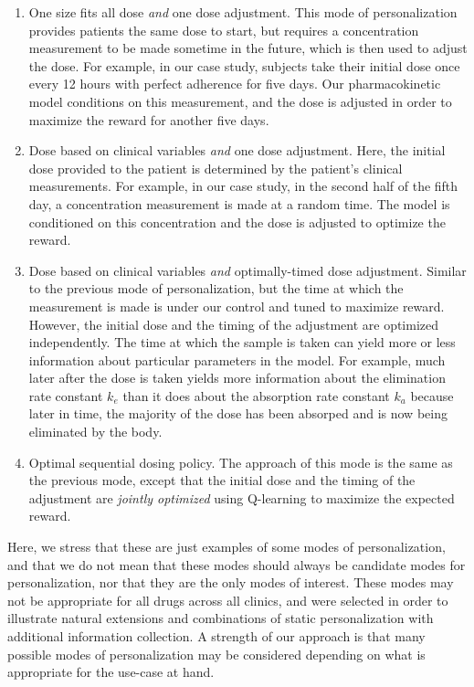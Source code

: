 \begin{enumerate}
	\item One size fits all dose \textit{and} one dose adjustment.  This mode of personalization provides patients the same dose to start, but requires a concentration measurement to be made sometime in the future, which is then used to adjust the dose.  For example, in our case study, subjects take their initial dose once every 12 hours with perfect adherence for five days.  Our pharmacokinetic model conditions on this measurement, and the dose is adjusted in order to maximize the reward for another five days.
	
	\item Dose based on clinical variables \textit{and} one dose adjustment.  Here, the initial dose provided to the patient is determined by the patient's clinical measurements. For example, in our case study, in the second half of the fifth day, a concentration measurement is made at a random time. The model is conditioned on this concentration and the dose is adjusted to optimize the reward.
	
	\item Dose based on clinical variables \textit{and} optimally-timed dose adjustment.  Similar to the previous mode of personalization, but the time at which the measurement is made is under our control and tuned to maximize reward. However, the initial dose and the timing of the adjustment are optimized independently. The time at which the sample is taken can yield more or less information about particular parameters in the model. For example, much later after the dose is taken yields more information about the elimination rate constant $k_e$ than it does about the absorption rate constant $k_a$ because later in time, the majority of the dose has been absorped and is now being eliminated by the body.
	
	\item Optimal sequential dosing policy. The approach of this mode is the same as the previous mode, except that the initial dose and the timing of the adjustment are \textit{jointly optimized} using Q-learning to maximize the expected reward.
\end{enumerate}

Here, we stress that these are just examples of some modes of personalization, and that we do not mean that these modes should always be candidate modes for personalization, nor that they are the only modes of interest.  These modes may not be appropriate for all drugs across all clinics, and were selected in order to illustrate natural extensions and combinations of static personalization with additional information collection. A strength of our approach is that many possible modes of personalization may be considered depending on what is appropriate for the use-case at hand.

